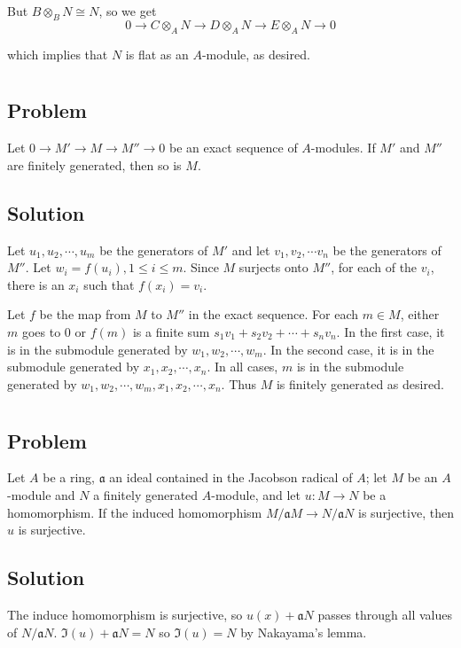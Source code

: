 \documentclass[book,12pt,oneside,openany]{memoir}
\begin{document}
But $B \otimes_B N \cong N$, so we get 
 \[0 \rightarrow C \otimes_A  N \rightarrow D \otimes_A N \rightarrow E \otimes_A  N \rightarrow 0\] 

which implies that $N$ is flat as an $A$-module, as desired.
\section{}
\subsection{Problem}
Let $0 \rightarrow M' \rightarrow M \rightarrow M'' \rightarrow 0$ be an exact sequence of $A$-modules. If $M'$ and $M''$ are finitely generated, then so is $M$.

\subsection{Solution}
Let $u_1, u_2, \cdots, u_m$ be the generators of $M'$ and let $v_1, v_2, \cdots v_n$ be the generators of $M''$. Let $w_i = f(u_i), 1 \leq i \leq m$. Since $M$ surjects onto $M''$, for each of the $v_i$, there is an $x_i$ such that $f(x_i) = v_i$.

Let $f$ be the map from $M$ to $M''$ in the exact sequence. For each $m \in M$, either $m$ goes to 0 or $f(m)$ is a finite sum $s_1 v_1 + s_2 v_2 + \cdots + s_n v_n$. In the first case, it is in the submodule generated by $w_1, w_2, \cdots, w_m$. In the second case, it is in the submodule generated by $x_1, x_2, \cdots, x_n$. In all cases, $m$ is in the submodule generated by $w_1, w_2, \cdots, w_m, x_1, x_2, \cdots, x_n$. Thus $M$ is finitely generated as desired.

\section{}
\subsection{Problem}
Let $A$ be a ring, $\mathfrak{a}$ an ideal contained in the Jacobson radical of $A$; let $M$ be an $A$-module and $N$ a finitely generated $A$-module, and let $u: M \rightarrow N$ be a homomorphism. If the induced homomorphism $M/\mathfrak{a}M \rightarrow N/\mathfrak{a}N$ is surjective, then $u$ is surjective.

\subsection{Solution}
The induce homomorphism is surjective, so $u(x)+\mathfrak aN$ passes through
all values of $N/\mathfrak aN$.
$\Im(u)+\mathfrak aN=N$ so $\Im(u)=N$ by Nakayama's lemma.
\end{document}
